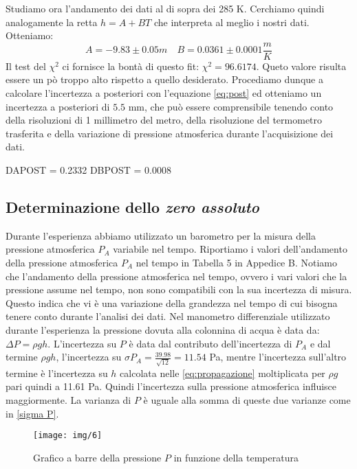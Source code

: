 \newline
Studiamo ora l'andamento dei dati al di sopra dei 285 K. 
Cerchiamo quindi analogamente la retta $h = A+BT$ che interpreta al meglio i nostri dati. 
Otteniamo:
\[A = -9.83 \pm 0.05 m \quad  B = 0.0361 \pm 0.0001\frac{m}{K}\]
Il test del $\chi^2$ ci fornisce la bontà di questo fit: $\chi^2 = 96.6174 $. 
Queto valore risulta essere un pò troppo alto rispetto a quello desiderato. 
Procediamo dunque a calcolare l'incertezza a posteriori con l'equazione \eqref{eq:post} ed otteniamo un incertezza a posteriori di $ 5.5 $ mm, che può essere comprensibile tenendo conto della risoluzioni di 1 millimetro del metro, della risoluzione del termometro trasferita e della variazione di pressione atmosferica durante l'acquisizione dei dati.

DAPOST = 0.2332
DBPOST = 0.0008
\subsection{Determinazione dello \emph{zero assoluto}}
Durante l'esperienza abbiamo utilizzato un barometro per la misura della pressione atmosferica $P_A$ variabile nel tempo. 
Riportiamo i valori dell'andamento della pressione atmosferica $P_A$ nel tempo in Tabella 5 in Appedice B.
Notiamo che l'andamento della pressione atmosferica nel tempo, ovvero i vari valori che la pressione assume nel tempo, non sono compatibili con la sua incertezza di misura.
Questo indica che vi è una variazione della grandezza nel tempo di cui bisogna tenere conto durante l'analisi dei dati.
Nel manometro differenziale utilizzato durante l'esperienza la pressione dovuta alla colonnina di acqua è data da: $\Delta P = \rho gh$. 
L'incertezza su $P$ è data dal contributo dell'incertezza di $P_A$ e dal termine $\rho gh$, l'incertezza su $\sigma P_A = \frac{39.98}{\sqrt{12}} = 11.54$ Pa, mentre l'incertezza sull'altro termine è l'incertezza su $h$ calcolata nelle \eqref{eq:propagazione} moltiplicata per $\rho g$ pari quindi a 11.61 Pa.  
Quindi l'incertezza sulla pressione atmosferica influisce maggiormente.
La varianza di $P$ è uguale alla somma di queste due varianze come in \eqref{sigma P}.

\begin{figure}[H]
\centering
\texttt{[image: img/6]}
\caption{Grafico a barre della pressione $P$ in funzione della temperatura}
\end{figure}


